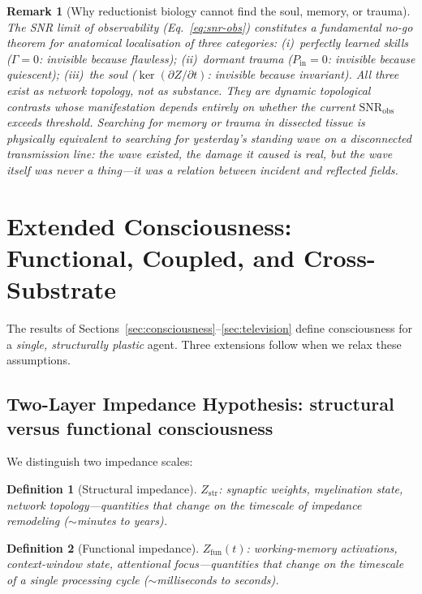 \documentclass[aps,pre,twocolumn,superscriptaddress,floatfix]{revtex4-2}
\newtheorem{definition}{Definition}
\newtheorem{remark}{Remark}
\begin{document}
\begin{remark}[Why reductionist biology cannot
  find the soul, memory, or trauma]
\label{rem:reductionism}
The SNR limit of observability
(Eq.~\ref{eq:snr-obs}) constitutes a fundamental
\emph{no-go theorem} for anatomical localisation
of three categories:
(i)~perfectly learned skills ($\Gamma = 0$:
invisible because flawless);
(ii)~dormant trauma ($P_{\text{in}} = 0$:
invisible because quiescent);
(iii)~the soul ($\ker(\partial Z/\partial t)$:
invisible because invariant).
All three exist as \emph{network topology}, not as
\emph{substance}.
They are dynamic topological contrasts whose
manifestation depends entirely on whether the
current $\mathrm{SNR}_{\text{obs}}$ exceeds
threshold.
Searching for memory or trauma in dissected tissue
is physically equivalent to searching for
yesterday's standing wave on a disconnected
transmission line: the wave existed, the damage
it caused is real, but the wave itself was never
a thing---it was a \emph{relation} between
incident and reflected fields.
\end{remark}


\section{Extended Consciousness: Functional, Coupled,
  and Cross-Substrate}
\label{sec:extended}

The results of Sections~\ref{sec:consciousness}--\ref{sec:television}
define consciousness for a \emph{single, structurally plastic}
agent.  Three extensions follow when we relax these assumptions.

\subsection{Two-Layer Impedance Hypothesis:
  structural versus functional consciousness}
\label{sec:two-layer}

We distinguish two impedance scales:
\begin{definition}[Structural impedance]
$Z_{\text{str}}$: synaptic weights, myelination state,
network topology---quantities that change on the timescale
of impedance remodeling ($\sim$minutes to years).
\end{definition}
\begin{definition}[Functional impedance]
$Z_{\text{fun}}(t)$: working-memory activations,
context-window state, attentional focus---quantities that
change on the timescale of a single processing cycle
($\sim$milliseconds to seconds).
\end{definition}
\end{document}
